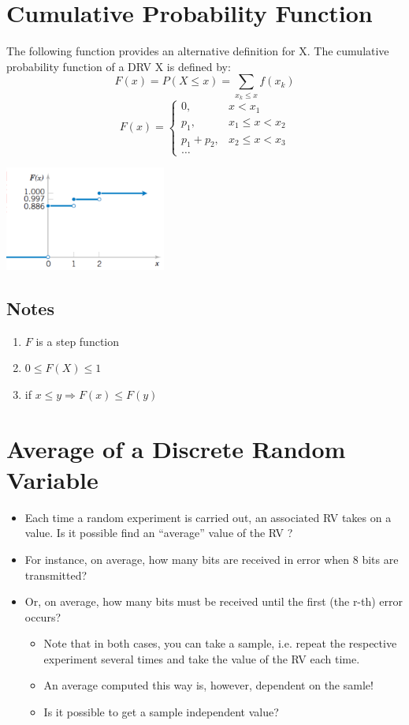 \documentclass[12pt]{article}
\theoremstyle{definition}
\begin{document}
\section{Cumulative Probability Function}
The following function provides an alternative definition for X.
The cumulative probability function of a DRV X is defined by:
\[
    \displaystyle F(x) = P(X \leq x) = \sum_{x_k \leq x}f(x_k)
\]
\[ F(x)= \begin{cases} 
      0, & x < x_1 \\
      p_1, & x_1 \leq x < x_2 \\
      p_1 + p_2, & x_2 \leq x < x_3 \\
      \dots
   \end{cases}
\]
\begin{center}
\includegraphics[width=200px]{3.png}
\end{center}
\subsection{Notes}
\begin{enumerate}
    \item $F$ is a step function
    \item $  0 \leq F(X) \leq 1   $
    \item if $x \leq y \Rightarrow F(x) \leq F(y)$
\end{enumerate}
\section{Average of a Discrete Random Variable}
\begin{itemize}
    \item Each time a random experiment is carried out, an associated RV takes on a
    value. Is it possible find an “average” value of the RV ?
    \item For instance, on average, how many bits are received in error
    when 8 bits are transmitted?
    \item Or, on average, how many bits must be received until the first (the
    r-th) error occurs?
    \begin{itemize}
        \item Note that in both cases, you can take a sample, i.e. repeat the
        respective experiment several times and take the value of the
        RV each time.
        \item An average computed this way is, however, dependent on the samle!
        \item Is it possible to get a sample independent value?
    \end{itemize}
\end{itemize}
\end{document}
